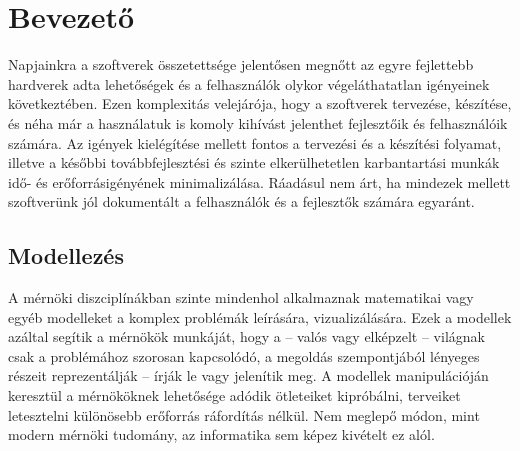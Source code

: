 \chapter{Bevezető}%


Napjainkra a szoftverek összetettsége jelentősen megnőtt az egyre fejlettebb hardverek adta lehetőségek és a felhasználók olykor végeláthatatlan igényeinek következtében.
Ezen komplexitás velejárója, hogy a szoftverek tervezése, készítése, és néha már a használatuk is komoly kihívást jelenthet fejlesztőik és felhasználóik számára.
Az igények kielégítése mellett fontos a tervezési és a készítési folyamat, illetve a későbbi továbbfejlesztési és szinte elkerülhetetlen karbantartási munkák idő- és erőforrásigényének minimalizálása.
Ráadásul nem árt, ha mindezek mellett szoftverünk jól dokumentált a felhasználók és a fejlesztők számára egyaránt.  

\section{Modellezés}

A mérnöki diszciplínákban szinte mindenhol alkalmaznak matematikai vagy egyéb modelleket a komplex problémák leírására, vizualizálására.
Ezek a modellek azáltal segítik a mérnökök munkáját, hogy a -- valós vagy elképzelt -- világnak csak a problémához szorosan kapcsolódó, a megoldás szempontjából lényeges részeit reprezentálják -- írják le vagy jelenítik meg.
A modellek manipulációján keresztül a mérnököknek lehetősége adódik ötleteiket kipróbálni, terveiket letesztelni különösebb erőforrás ráfordítás nélkül.
Nem meglepő módon, mint modern mérnöki tudomány, az informatika sem képez kivételt ez alól.

